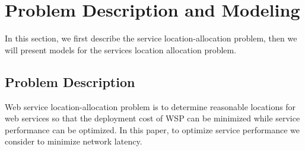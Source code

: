\documentclass{llncs}
\begin{document}
%
%
%
%
%
%
\section{Problem Description and Modeling}
\label{sec:problem}
In this section, we first describe the service location-allocation problem, then we will present models for the services location allocation problem.

\subsection{Problem Description}
Web service location-allocation problem is to determine reasonable locations for web services so that the deployment cost of WSP can be minimized while service performance can be optimized.
In this paper, to optimize service performance we consider to minimize network latency.
\end{document}
